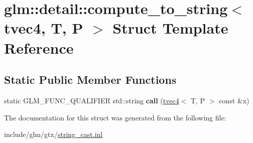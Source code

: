 \hypertarget{structglm_1_1detail_1_1compute__to__string_3_01tvec4_00_01T_00_01P_01_4}{}\section{glm\+:\+:detail\+:\+:compute\+\_\+to\+\_\+string$<$ tvec4, T, P $>$ Struct Template Reference}
\label{structglm_1_1detail_1_1compute__to__string_3_01tvec4_00_01T_00_01P_01_4}
\subsection*{Static Public Member Functions}
\begin{DoxyCompactItemize}
\item 
\mbox{\label{structglm_1_1detail_1_1compute__to__string_3_01tvec4_00_01T_00_01P_01_4_aa91e3c2d9b945aaf2dd840690de03437}} 
static G\+L\+M\+\_\+\+F\+U\+N\+C\+\_\+\+Q\+U\+A\+L\+I\+F\+I\+ER std\+::string {\bfseries call} (\hyperlink{structglm_1_1tvec4}{tvec4}$<$ T, P $>$ const \&x)
\end{DoxyCompactItemize}


The documentation for this struct was generated from the following file\+:\begin{DoxyCompactItemize}
\item 
include/glm/gtx/\hyperlink{string__cast_8inl}{string\+\_\+cast.\+inl}\end{DoxyCompactItemize}

